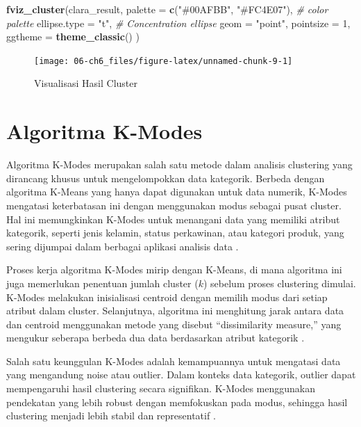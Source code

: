 \documentclass[
  oneside]{book}
\newenvironment{Shaded}{\begin{snugshade}}{\end{snugshade}}
\newcommand{\AttributeTok}[1]{\textcolor[rgb]{0.13,0.29,0.53}{#1}}
\newcommand{\CommentTok}[1]{\textcolor[rgb]{0.56,0.35,0.01}{\textit{#1}}}
\newcommand{\DecValTok}[1]{\textcolor[rgb]{0.00,0.00,0.81}{#1}}
\newcommand{\FunctionTok}[1]{\textcolor[rgb]{0.13,0.29,0.53}{\textbf{#1}}}
\newcommand{\NormalTok}[1]{#1}
\newcommand{\StringTok}[1]{\textcolor[rgb]{0.31,0.60,0.02}{#1}}
\begin{document}
\begin{Shaded}
\begin{Highlighting}[]
\FunctionTok{fviz\_cluster}\NormalTok{(clara\_result,}
\AttributeTok{palette =} \FunctionTok{c}\NormalTok{(}\StringTok{"\#00AFBB"}\NormalTok{, }\StringTok{"\#FC4E07"}\NormalTok{), }\CommentTok{\# color palette}
\AttributeTok{ellipse.type =} \StringTok{"t"}\NormalTok{, }\CommentTok{\# Concentration ellipse}
\AttributeTok{geom =} \StringTok{"point"}\NormalTok{, }\AttributeTok{pointsize =} \DecValTok{1}\NormalTok{,}
\AttributeTok{ggtheme =} \FunctionTok{theme\_classic}\NormalTok{()}
\NormalTok{)}
\end{Highlighting}
\end{Shaded}

\begin{figure}[h]

{\centering \texttt{[image: 06-ch6\_files/figure-latex/unnamed-chunk-9-1]} 

}

\caption{Visualisasi Hasil Cluster}\label{fig:unnamed-chunk-9}
\end{figure}

\chapter{Algoritma K-Modes}\label{kmods}

Algoritma K-Modes merupakan salah satu metode dalam analisis clustering
yang dirancang khusus untuk mengelompokkan data kategorik. Berbeda
dengan algoritma K-Means yang hanya dapat digunakan untuk data numerik,
K-Modes mengatasi keterbatasan ini dengan menggunakan modus sebagai
pusat cluster. Hal ini memungkinkan K-Modes untuk menangani data yang
memiliki atribut kategorik, seperti jenis kelamin, status perkawinan,
atau kategori produk, yang sering dijumpai dalam berbagai aplikasi
analisis data \citep{handayani2020}.

Proses kerja algoritma K-Modes mirip dengan K-Means, di mana algoritma
ini juga memerlukan penentuan jumlah cluster (\(k\)) sebelum proses
clustering dimulai. K-Modes melakukan inisialisasi centroid dengan
memilih modus dari setiap atribut dalam cluster. Selanjutnya, algoritma
ini menghitung jarak antara data dan centroid menggunakan metode yang
disebut ``dissimilarity measure,'' yang mengukur seberapa berbeda dua data
berdasarkan atribut kategorik \citep{buulolo2020}.

Salah satu keunggulan K-Modes adalah kemampuannya untuk mengatasi data
yang mengandung noise atau outlier. Dalam konteks data kategorik,
outlier dapat mempengaruhi hasil clustering secara signifikan. K-Modes
menggunakan pendekatan yang lebih robust dengan memfokuskan pada modus,
sehingga hasil clustering menjadi lebih stabil dan representatif
\citep{hardandy2017}.
\end{document}
